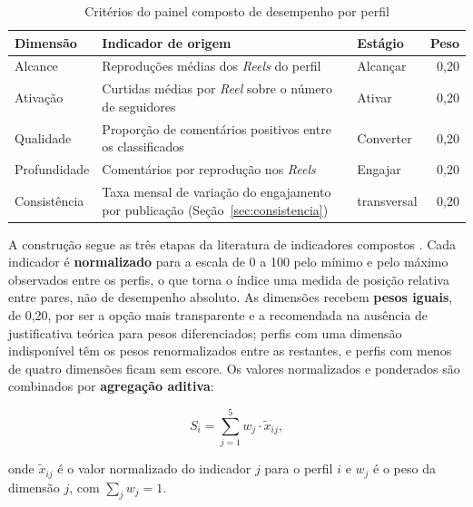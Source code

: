 \begin{table}[htb]
\centering
\caption{Critérios do painel composto de desempenho por perfil}
\label{tab:painel_criterios}
\small
\begin{tabular}{p{2.4cm}p{6.6cm}p{2.2cm}r}
\toprule
\textbf{Dimensão} & \textbf{Indicador de origem} & \textbf{Estágio} & \textbf{Peso} \\
\midrule
Alcance & Reproduções médias dos \emph{Reels} do perfil & Alcançar & 0,20 \\
Ativação & Curtidas médias por \emph{Reel} sobre o número de seguidores & Ativar & 0,20 \\
Qualidade & Proporção de comentários positivos entre os classificados & Converter & 0,20 \\
Profundidade & Comentários por reprodução nos \emph{Reels} & Engajar & 0,20 \\
Consistência & Taxa mensal de variação do engajamento por publicação (Seção~\ref{sec:consistencia}) & transversal & 0,20 \\
\bottomrule
\end{tabular}
\end{table}

A construção segue as três etapas da literatura de indicadores compostos \cite{nardo2008}. Cada indicador é \textbf{normalizado} para a escala de 0 a 100 pelo mínimo e pelo máximo observados entre os perfis, o que torna o índice uma medida de posição relativa entre pares, não de desempenho absoluto. As dimensões recebem \textbf{pesos iguais}, de 0,20, por ser a opção mais transparente e a recomendada na ausência de justificativa teórica para pesos diferenciados; perfis com uma dimensão indisponível têm os pesos renormalizados entre as restantes, e perfis com menos de quatro dimensões ficam sem escore. Os valores normalizados e ponderados são combinados por \textbf{agregação aditiva}:

\begin{equation}
S_i = \sum_{j=1}^{5} w_j \cdot \tilde{x}_{ij},
\label{eq:indice_composto}
\end{equation}

\noindent onde $\tilde{x}_{ij}$ é o valor normalizado do indicador $j$ para o perfil $i$ e $w_j$ é o peso da dimensão $j$, com $\sum_j w_j = 1$.

